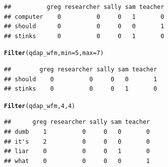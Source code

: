 \documentclass{article}\usepackage[]{graphicx}\usepackage[]{color}
\makeatletter
\newcommand{\hlnum}[1]{\textcolor[rgb]{0.686,0.059,0.569}{#1}}%
\newcommand{\hlstd}[1]{\textcolor[rgb]{0.345,0.345,0.345}{#1}}%
\newcommand{\hlkwc}[1]{\textcolor[rgb]{0.333,0.667,0.333}{#1}}%
\newcommand{\hlkwd}[1]{\textcolor[rgb]{0.737,0.353,0.396}{\textbf{#1}}}%
\newenvironment{kframe}{%
 \def\at@end@of@kframe{}%
 \ifinner\ifhmode%
  \def\at@end@of@kframe{\end{minipage}}%
  \begin{minipage}{\columnwidth}%
 \fi\fi%
 \def\FrameCommand##1{\hskip\@totalleftmargin \hskip-\fboxsep
 \colorbox{shadecolor}{##1}\hskip-\fboxsep
     \hskip-\linewidth \hskip-\@totalleftmargin \hskip\columnwidth}%
 \MakeFramed {\advance\hsize-\width
   \@totalleftmargin\z@ \linewidth\hsize
   \@setminipage}}%
 {\par\unskip\endMakeFramed%
 \at@end@of@kframe}
\newenvironment{knitrout}{}{} %
\makeatother
\begin{document}
\begin{knitrout}
\color{fgcolor}\begin{kframe}
\begin{verbatim}
##          greg researcher sally sam teacher
## computer    0          0     0   1       0
## should      0          0     0   0       1
## stinks      0          0     0   1       0
\end{verbatim}
\end{kframe}
\end{knitrout}



\begin{knitrout}
\color{fgcolor}\begin{kframe}
\begin{alltt}
\hlkwd{Filter}\hlstd{(qdap_wfm,} \hlkwc{min} \hlstd{=} \hlnum{5}\hlstd{,} \hlkwc{max} \hlstd{=} \hlnum{7}\hlstd{)}
\end{alltt}
\end{kframe}
\end{knitrout}


\begin{knitrout}
\color{fgcolor}\begin{kframe}
\begin{verbatim}
##        greg researcher sally sam teacher
## should    0          0     0   0       1
## stinks    0          0     0   1       0
\end{verbatim}
\end{kframe}
\end{knitrout}


\begin{knitrout}
\color{fgcolor}\begin{kframe}
\begin{alltt}
\hlkwd{Filter}\hlstd{(qdap_wfm,} \hlnum{4}\hlstd{,} \hlnum{4}\hlstd{)}
\end{alltt}
\end{kframe}
\end{knitrout}


\begin{knitrout}
\color{fgcolor}\begin{kframe}
\begin{verbatim}
##      greg researcher sally sam teacher
## dumb    1          0     0   0       0
## it's    2          0     0   0       0
## liar    0          0     0   1       0
## what    0          0     0   0       1
\end{verbatim}
\end{kframe}
\end{knitrout}
\end{document}

